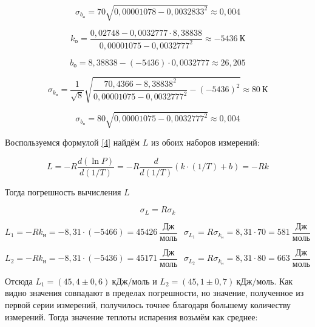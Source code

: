 \documentclass[a4paper,12pt]{article}
\begin{document}
\begin{equation}
    \sigma_{b_\text{н}} = 70 \sqrt{0,00001078 - {0,0032833}^2} \approx 0,004
\end{equation}

\begin{equation}
    k_\text{о} = \frac{0,02748 - 0,0032777 \cdot 8,38838}{0,00001075 - {0,0032777}^2} \approx -5436 \ \text{К}
\end{equation}

\begin{equation}
    b_\text{о} = 8,38838 - (-5436) \cdot 0,0032777 \approx 26,205
\end{equation}

\begin{equation}
    \sigma_{k_\text{о}} = \frac{1}{\sqrt{8}} \sqrt{
    \frac{70,4366 - {8,38838}^2}{0,00001075 - {0,0032777}^2} - (-5436)^2
    } \approx 80 \ \text{К}
\end{equation}

\begin{equation}
    \sigma_{b_\text{о}} = 80 \sqrt{0,00001075 - {0,0032777}^2} \approx 0,004
\end{equation}

Воспользуемся формулой \eqref{4} найдём $L$ из обоих наборов измерений:

\begin{equation}
    L = - R \frac{d(\ln{P})}{d(1/T)} = -R \frac{d}{d(1/T)} \left( k \cdot (1/T) + b \right) = -R k
\end{equation}

Тогда погрешность вычисления $L$

\begin{equation}
    \sigma_L = R \sigma_k
\end{equation}

\begin{equation}
    L_1 = -R k_\text{н} = -8,31 \cdot (-5466) = 45426 \ \frac{\text{Дж}}{\text{моль}} \ \ \ \sigma_{L_1} = R \sigma_{k_\text{н}} = 8,31 \cdot 70 = 581 \ \frac{\text{Дж}}{\text{моль}}
\end{equation}

\begin{equation}
    L_2 = -R k_\text{н} = -8,31 \cdot (-5436) = 45171 \ \frac{\text{Дж}}{\text{моль}} \ \ \ \sigma_{L_2} = R \sigma_{k_\text{н}} = 8,31 \cdot 80 = 663 \ \frac{\text{Дж}}{\text{моль}}
\end{equation}

Отсюда $L_1 = (45,4 \pm 0,6) \ \text{кДж}/\text{моль}$ и $L_2 = (45,1 \pm 0,7) \ \text{кДж}/\text{моль}$. Как видно значения совпадают в пределах погрешности, но значение, полученное из первой серии измерений, получилось точнее благодаря большему количеству измерений. Тогда значение теплоты испарения возьмём как среднее:
\end{document}
